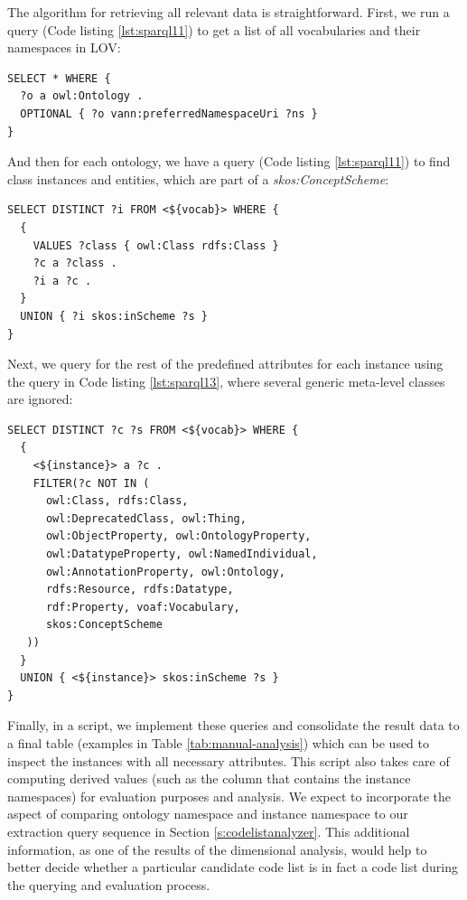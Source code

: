 The algorithm for retrieving all relevant data is straightforward. First, we run a query (Code listing \ref{lst:sparql11}) to get a list of all vocabularies and their namespaces in LOV:

\begin{lstlisting}[captionpos=b, caption=Query to retrieve all ontologies and their namespaces,label=lst:sparql11,basicstyle=\small\ttfamily,frame=single]
SELECT * WHERE {
  ?o a owl:Ontology .
  OPTIONAL { ?o vann:preferredNamespaceUri ?ns }
}
\end{lstlisting}

And then for each ontology, we have a query (Code listing \ref{lst:sparql11}) to find class instances and entities, which are part of a \textit{skos:ConceptScheme}:

\begin{lstlisting}[captionpos=b, caption=Query to retrieve all class instances and skos:ConceptScheme members,label=lst:sparql12,basicstyle=\small\ttfamily,frame=single]
SELECT DISTINCT ?i FROM <${vocab}> WHERE {
  {
    VALUES ?class { owl:Class rdfs:Class }
    ?c a ?class .
    ?i a ?c .
  }
  UNION { ?i skos:inScheme ?s }
}
\end{lstlisting}

Next, we query for the rest of the predefined attributes for each instance using the query in Code listing \ref{lst:sparql13}, where several generic meta-level classes are ignored:

\begin{lstlisting}[captionpos=b, caption=Query to retrieve all class instances and skos:ConceptScheme members,label=lst:sparql13,basicstyle=\small\ttfamily,frame=single]
SELECT DISTINCT ?c ?s FROM <${vocab}> WHERE {
  {
    <${instance}> a ?c .
    FILTER(?c NOT IN (
      owl:Class, rdfs:Class,
      owl:DeprecatedClass, owl:Thing, 
      owl:ObjectProperty, owl:OntologyProperty,
      owl:DatatypeProperty, owl:NamedIndividual,
      owl:AnnotationProperty, owl:Ontology,
      rdfs:Resource, rdfs:Datatype,
      rdf:Property, voaf:Vocabulary, 
      skos:ConceptScheme
   ))
  }
  UNION { <${instance}> skos:inScheme ?s }
}
\end{lstlisting}

Finally, in a script, %
we implement these queries and consolidate the result data to a final table %
(examples in Table \ref{tab:manual-analysis}) which can be used to inspect the instances with all necessary attributes. This script also takes care of computing derived values (such as the column that contains the instance namespaces) for evaluation purposes and analysis. We expect to incorporate the aspect of comparing ontology namespace and instance namespace to our extraction query sequence in Section \ref{s:codelistanalyzer}. This additional information, as one of the results of the dimensional analysis, would help to better decide whether a particular candidate code list is in fact a code list during the querying and evaluation process.


